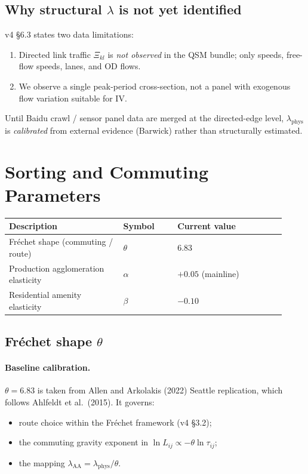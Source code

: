 \documentclass[11pt]{article}
\newcommand{\phys}{\mathrm{phys}}
\newcommand{\AAcal}{\mathrm{AA}}
\begin{document}
\subsection{Why structural $\lambda$ is not yet identified}

v4 \S6.3 states two data
limitations:
\begin{enumerate}[leftmargin=2em]
  \item Directed link traffic $\Xi_{kl}$ is \emph{not observed} in the
        QSM bundle; only speeds, free-flow speeds, lanes, and OD flows.
  \item We observe a single peak-period cross-section, not a panel with
        exogenous flow variation suitable for IV.
\end{enumerate}
Until Baidu crawl / sensor panel data are merged at the directed-edge
level, $\lambda_{\phys}$ is \emph{calibrated} from external evidence
(Barwick) rather than structurally estimated.

\section{Sorting and Commuting Parameters}\label{sec:sorting}

\begin{longtable}{@{}p{0.38\linewidth}p{0.18\linewidth}p{0.36\linewidth}@{}}
\toprule
\textbf{Description} & \textbf{Symbol} & \textbf{Current value} \\
\midrule
\endhead
Fr\'echet shape (commuting / route) & $\theta$ & $\mathbf{6.83}$ \\
Production agglomeration elasticity & $\alpha$ & $\mathbf{+0.05}$ (mainline) \\
Residential amenity elasticity & $\beta$ & $\mathbf{-0.10}$ \\
\bottomrule
\end{longtable}

\subsection{Fr\'echet shape $\theta$}

\paragraph{Baseline calibration.}
$\theta=6.83$ is taken from Allen and Arkolakis (2022) Seattle
replication, which follows Ahlfeldt et al.\ (2015).  It governs:
\begin{itemize}[leftmargin=2em]
  \item route choice within the Fr\'echet framework (v4 \S3.2);
  \item the commuting gravity exponent in
        $\ln L_{ij} \propto -\theta\ln\tau_{ij}$;
  \item the mapping $\lambda_{\AAcal}=\lambda_{\phys}/\theta$.
\end{itemize}
\end{document}
